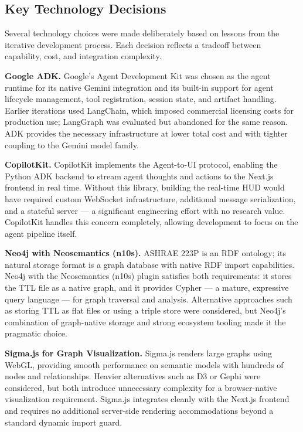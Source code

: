 \subsection{Key Technology Decisions}

Several technology choices were made deliberately based on lessons from the iterative
development process. Each decision reflects a tradeoff between capability, cost, and
integration complexity.

\textbf{Google ADK.}
Google's Agent Development Kit was chosen as the agent runtime for its native Gemini
integration and its built-in support for agent lifecycle management, tool registration,
session state, and artifact handling. Earlier iterations used LangChain, which imposed
commercial licensing costs for production use; LangGraph was evaluated but abandoned for
the same reason. ADK provides the necessary infrastructure at lower total cost and with
tighter coupling to the Gemini model family.

\textbf{CopilotKit.}
CopilotKit implements the Agent-to-UI protocol, enabling the Python ADK backend to stream
agent thoughts and actions to the Next.js frontend in real time. Without this library,
building the real-time HUD would have required custom WebSocket infrastructure, additional
message serialization, and a stateful server — a significant engineering effort with no
research value. CopilotKit handles this concern completely, allowing development to focus
on the agent pipeline itself.

\textbf{Neo4j with Neosemantics (n10s).}
ASHRAE 223P is an RDF ontology; its natural storage format is a graph database with
native RDF import capabilities. Neo4j with the Neosemantics (n10s) plugin satisfies both
requirements: it stores the TTL file as a native graph, and it provides Cypher --- a
mature, expressive query language --- for graph traversal and analysis. Alternative
approaches such as storing TTL as flat files or using a triple store were considered, but
Neo4j's combination of graph-native storage and strong ecosystem tooling made it the
pragmatic choice.

\textbf{Sigma.js for Graph Visualization.}
Sigma.js renders large graphs using WebGL, providing smooth performance on semantic models
with hundreds of nodes and relationships. Heavier alternatives such as D3 or Gephi were
considered, but both introduce unnecessary complexity for a browser-native visualization
requirement. Sigma.js integrates cleanly with the Next.js frontend and requires no
additional server-side rendering accommodations beyond a standard dynamic import guard.
